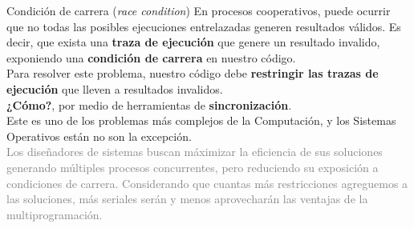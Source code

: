 \documentclass[aspectratio=169]{beamer}
\begin{document}
\begin{frame}[fragile,t]{Condición de carrera (\emph{race condition})}
    En procesos cooperativos, puede ocurrir que no todas las posibles ejecuciones entrelazadas generen resultados válidos.
    Es decir, que exista una \textbf{traza de ejecución} que genere un resultado invalido, exponiendo una \textcolor{naranjauca}{\textbf{condición de carrera}} en nuestro código.\\
    \bigskip
    \pause
    Para resolver este problema, nuestro código debe \textcolor{naranjauca}{\textbf{restringir las trazas de ejecución}} que lleven a resultados invalidos.\\
    \bigskip
    \pause
    \textcolor{verdeuca}{\textbf{¿Cómo?}}, por medio de herramientas de \textcolor{naranjauca}{\textbf{sincronización}}.\\
    \bigskip
    \pause
    Este es uno de los problemas más complejos de la Computación, y los Sistemas Operativos están no son la excepción.\\
    \medskip
    \pause
    \textcolor{gray}{
    Los diseñadores de sistemas buscan máximizar la eficiencia de sus soluciones generando múltiples procesos concurrentes,
    pero reduciendo su exposición a condiciones de carrera.
    Considerando que cuantas más restricciones agreguemos a las soluciones, más seriales serán y menos aprovecharán las ventajas de la multiprogramación.
    }
\end{frame}
\end{document}
